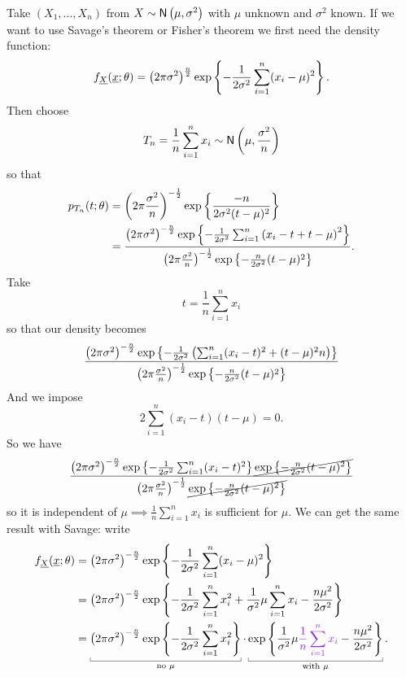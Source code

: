 \documentclass[12pt]{report}
\begin{document}
Take $(X_{1},\ldots,X_{n})$ from $X\sim\mathsf{N}\left(\mu,\sigma^{2}\right)$ with $\mu$ unknown and $\sigma^{2}$ known. If we want to use Savage's theorem or Fisher's theorem we first need the density function:
\begin{equation*}
	f_{\underline{X}}(\underline{x};\theta)=\left(2\pi\sigma^{2}\right)^{\frac{n}{2}}\exp\left\{-\frac{1}{2\sigma^{2}}\sum_{i=1}^{n}(x_{i}-\mu)^{2}\right\}.
\end{equation*}
Then choose
\begin{equation*}
	T_{n}=\frac{1}{n}\sum_{i=1}^{n}x_{i}\sim\mathsf{N}\left(\mu,\frac{\sigma^{2}}{n}\right)
\end{equation*}
so that 
\begin{align*}
	p_{T_{n}}(t;\theta)&=\left(2\pi\frac{\sigma^{2}}{n}\right)^{-\frac{1}{2}}\exp\left\{\frac{-n}{2\sigma^{2}(t-\mu)^{2}}\right\}\\
	&=\frac{\left(2\pi\sigma^{2}\right)^{-\frac{n}{2}}\exp\left\{-\frac{1}{2\sigma^{2}}\sum_{i=1}^{n}\left(x_{i}-t+t-\mu\right)^{2}\right\}}{\left(2\pi\frac{\sigma^{2}}{n}\right)^{-\frac{1}{2}}\exp\left\{-\frac{n}{2\sigma^{2}}(t-\mu)^{2}\right\}}.
\end{align*}
Take 
\begin{equation*}
	t=\frac{1}{n}\sum_{i=1}^{n}x_{i}
\end{equation*}
so that our density becomes
\begin{equation*}
	\frac{\left(2\pi\sigma^{2}\right)^{-\frac{n}{2}}\exp\left\{-\frac{1}{2\sigma^{2}}\left(\sum_{i=1}^{n}(x_{i}-t)^{2}+(t-\mu)^{2}n\right)\right\}}{\left(2\pi\frac{\sigma^{2}}{n}\right)^{-\frac{1}{2}}\exp\left\{-\frac{n}{2\sigma^{2}}(t-\mu)^{2}\right\}}
\end{equation*}
And we impose
\begin{equation*}
	2\sum_{i=1}^{n}(x_{i}-t)(t-\mu)=0.
\end{equation*}
So we have 
\begin{align*}
	\frac{\left(2\pi\sigma^{2}\right)^{-\frac{n}{2}}\exp\left\{-\frac{1}{2\sigma^{2}}\sum_{i=1}^{n}(x_{i}-t)^{2}\right\}\cancel{\exp\left\{-\frac{n}{2\sigma^{2}}(t-\mu)^{2}\right\}}}{\left(2\pi\frac{\sigma^{2}}{n}\right)^{-\frac{1}{2}}\cancel{\exp\left\{-\frac{n}{2\sigma^{2}}(t-\mu)^{2}\right\}}}
\end{align*}
so it is independent of $\mu\implies\frac{1}{n}\sum_{i=1}^{n}x_{i}$ is sufficient for $\mu$. We can get the same result with Savage: write
\begin{align*}
	f_{\ulX}(\ulx;\theta)&=\left(2\pi\sigma^{2}\right)^{-\frac{n}{2}}\expg{-\frac{1}{2\sigma^{2}}\sum_{i=1}^{n}(x_{i}-\mu)^{2}}\\
	&=\left(2\pi\sigma^{2}\right)^{-\frac{n}{2}}\expg{-\frac{1}{2\sigma^{2}}\sum_{i=1}^{n}x_{i}^{2}+\frac{1}{\sigma^{2}}\mu\sum_{i=1}^{n}x_{i}-\frac{n\mu^{2}}{2\sigma^{2}}}\\
	&=\ubracketthin{\left(2\pi\sigma^{2}\right)^{-\frac{n}{2}}\expg{-\frac{1}{2\sigma^{2}}\sum_{i=1}^{n}x_{i}^{2}}}_{\text{no }\mu}\cdot\ubracketthin{\expg{\frac{1}{\sigma^{2}}\mu\mathcolor{Purple2}{\frac{1}{n}\sum_{i=1}^{n}x_{i}}-\frac{n\mu^{2}}{2\sigma^{2}}}}_{\text{with }\mu}.
\end{align*}
\end{document}
